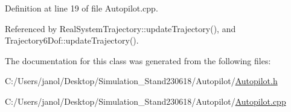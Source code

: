 Definition at line 19 of file Autopilot.\+cpp.



Referenced by Real\+System\+Trajectory\+::update\+Trajectory(), and Trajectory6\+Dof\+::update\+Trajectory().



The documentation for this class was generated from the following files\+:\begin{DoxyCompactItemize}
\item 
C\+:/\+Users/janol/\+Desktop/\+Simulation\+\_\+\+Stand230618/\+Autopilot/\hyperlink{_autopilot_8h}{Autopilot.\+h}\item 
C\+:/\+Users/janol/\+Desktop/\+Simulation\+\_\+\+Stand230618/\+Autopilot/\hyperlink{_autopilot_8cpp}{Autopilot.\+cpp}\end{DoxyCompactItemize}
